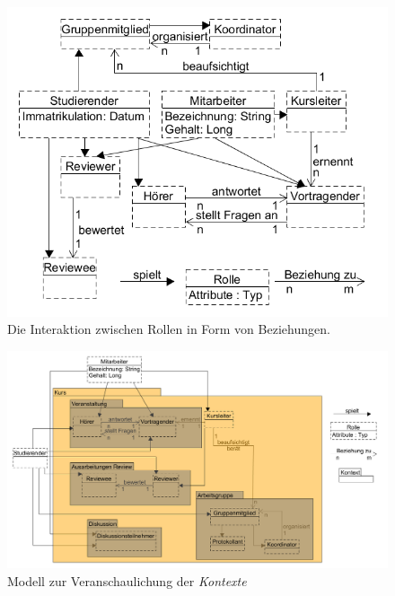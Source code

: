 \documentclass[conference]{IEEEtran}
\begin{document}
\begin{figure}
\includegraphics[scale=0.4]{Images/collabLearningRelations.PNG}
\caption{Die Interaktion zwischen Rollen in Form von Beziehungen.}
\end{figure}



\begin{figure}
\centering
\includegraphics[scale=0.4]{Images/collabLearningContexts.PNG}
\caption{Modell zur Veranschaulichung der \textit{Kontexte}}
\end{figure}
\end{document}
